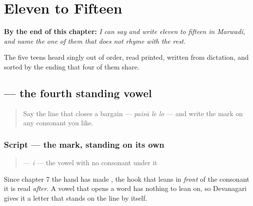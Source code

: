
\chapter{Eleven to Fifteen}
\label{ch:mw-teens-to-fifteen}

\begin{chapteropening}
\textbf{By the end of this chapter:} \emph{I can say and write eleven to fifteen in Marwadi, and name the one of them that does not rhyme with the rest.}

The five teens heard singly out of order, read printed, written from dictation, and sorted by the ending that four of them share.
\end{chapteropening}

\section[\texorpdfstring{\mw{इ} (i)}{इ (i)}]{ — the fourth standing vowel}

\label{lesson:MW-W37-i}



\begin{quote}
Say the line that closes a bargain — \emph{paisā le lo} — and write the \textbf{} mark on any consonant you like.
\end{quote}

\subsection*{Script — the mark, standing on its own}

\begin{quote}
\textbf{} — \emph{i} — the vowel with no consonant under it
\end{quote}

Since chapter 7 the hand has made \textbf{}, the hook that leans in \emph{front} of the consonant it is read \emph{after}. A vowel that opens a word has nothing to lean on, so Devanagari gives it a letter that stands on the line by itself.

